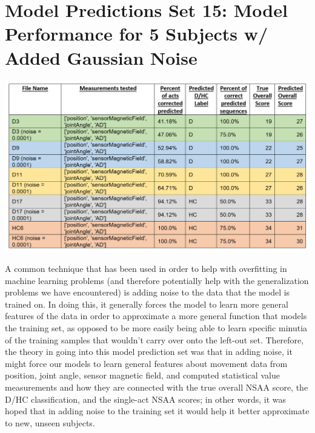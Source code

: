 \documentclass[12pt,twoside]{report}
\begin{document}
\section{Model Predictions Set 15: Model Performance for 5 Subjects w/ Added Gaussian Noise}

\begin{center}
\includegraphics[scale=0.5]{project_figures/fig11_22}
\end{center}

\quad A common technique that has been used in order to help with overfitting in machine learning problems (and therefore potentially help with the generalization problems we have encountered) is adding noise to the data that the model is trained on. In doing this, it generally forces the model to learn more general features of the data in order to approximate a more general function that models the training set, as opposed to be more easily being able to learn specific minutia of the training samples that wouldn’t carry over onto the left-out set. Therefore, the theory in going into this model prediction set was that in adding noise, it might force our models to learn general features about movement data from position, joint angle, sensor magnetic field, and computed statistical value measurements and how they are connected with the true overall NSAA score, the D/HC classification, and the single-act NSAA scores; in other words, it was hoped that in adding noise to the training set it would help it better approximate to new, unseen subjects.\\
\end{document}
